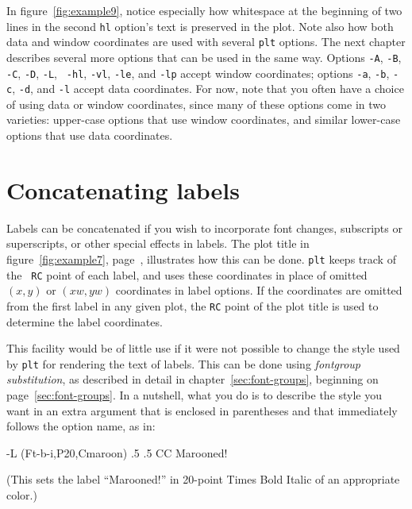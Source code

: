\documentclass{book}
\begin{document}
%
%
In figure~\ref{fig:example9}, notice especially how whitespace at the beginning
of two lines in the second {\tt hl} option's text is preserved in the plot.
Note also how both data and window coordinates are used with several {\tt plt}
options.  The next chapter describes several more options that can be used in
the same way.  Options {\tt -A}, {\tt -B}, {\tt -C}, {\tt -D}, {\tt -L}, {\tt
-hl}, {\tt -vl}, {\tt -le}, and {\tt -lp} accept window coordinates; options
{\tt -a}, {\tt -b}, {\tt -c}, {\tt -d}, and {\tt -l} accept data coordinates.
For now, note that you often have a choice of using data or window coordinates,
since many of these options come in two varieties: upper-case options that use
window coordinates, and similar lower-case options that use data coordinates.

\section{Concatenating labels \label{sec:concatenation}}

%
%
%
Labels can be concatenated if you wish to incorporate font changes,
subscripts or superscripts, or other special effects in labels.  The
plot title in figure~\ref{fig:example7}, page~\pageref{fig:example7},
illustrates how this can be done.  {\tt plt} keeps track of the {\tt
RC} point of each label, and uses these coordinates in place of
omitted $(x,y)$ or $(xw,yw)$ coordinates in label options.  If the
coordinates are omitted from the first label in any given plot, the
{\tt RC} point of the plot title is used to determine the label
coordinates.

%
This facility would be of little use if it were not possible to change
the style used by {\tt plt} for rendering the text of labels.  This
can be done using {\em fontgroup substitution}, as described in detail
in chapter~\ref{sec:font-groups}, beginning on
page~\ref{sec:font-groups}.  In a nutshell, what you do is to describe
the style you want in an extra argument that is enclosed in
parentheses and that immediately follows the option name, as in:
\begin{center}
\begin{boxedverbatim}
-L (Ft-b-i,P20,Cmaroon) .5 .5 CC Marooned!
\end{boxedverbatim}
\end{center}
(This sets the label ``Marooned!'' in 20-point Times Bold Italic of an
appropriate color.)
\end{document}
